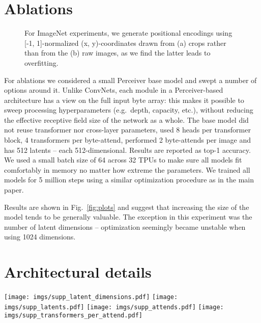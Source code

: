 \documentclass{article}
\begin{document}



\appendix
\appendixpage

\section{Ablations}
\label{sec:supp_ablations}

\begin{figure}[]
    \centering
    \caption{For ImageNet experiments, we generate positional encodings using [-1, 1]-normalized (x, y)-coordinates drawn from (a) crops rather than from the (b) raw images, as we find the latter leads to overfitting.}
    \label{fig:cropping}
    \vspace{-6pt}
\end{figure}

For ablations we considered a small Perceiver base model and swept a number of options around it. Unlike ConvNets, each module in a Perceiver-based architecture has a view on the full input byte array: this makes it possible to sweep processing hyperparameters (e.g.\ depth, capacity, etc.), without reducing the effective receptive field size of the network as a whole. The base model did not reuse transformer nor cross-layer parameters, used 8 heads per transformer block, 4 transformers per byte-attend, performed 2 byte-attends per image and has 512 latents -- each 512-dimensional. Results are reported as top-1 accuracy. We used a small batch size of 64 across 32 TPUs to make sure all models fit comfortably in memory no matter how extreme the parameters. We trained all models for 5 million steps using a similar optimization procedure as in the main paper. 

Results are shown in Fig.~\ref{fig:plots} and suggest that increasing the size of the model tends to  be generally valuable. The exception in this experiment was the number of latent dimensions --  optimization seemingly became unstable when using 1024 dimensions.


\section{Architectural details}

\begin{figure*}[t]
    \centering
\texttt{[image: imgs/supp\_latent\_dimensions.pdf]}
    \texttt{[image: imgs/supp\_latents.pdf]}
    \texttt{[image: imgs/supp\_attends.pdf]}
    \texttt{[image: imgs/supp\_transformers\_per\_attend.pdf]}
\caption{Ablations around a basic Perceiver architecture. Increasing the number of latents, attends and transformers per attends always seems to help.}
    \label{fig:plots}
\end{figure*}
\end{document}

